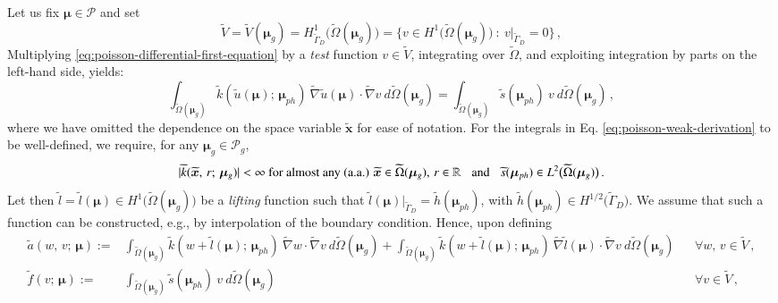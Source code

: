 \documentclass{elsarticle}
\numberwithin{equation}{section}
\theoremstyle{theorem}
\theoremstyle{definition}
\theoremstyle{remark}
\theoremstyle{proposition}
\numberwithin{figure}{section}
\newcommand{\wt}[1]{\widetilde{#1}}
\newcommand{\bg}[1]{\boldsymbol{#1}}
\begin{document}
		Let us fix $\bg{\mu} \in \mathcal{P}$ and set 
		\begin{equation*}
			\wt{V} = \wt{V}(\bg{\mu}_g) = H^1_{\wt{\Gamma}_D} \big( \wt{\Omega}(\bg{\mu}_g) \big) = \big\lbrace v \in H^1 \big( \wt{\Omega}(\bg{\mu}_g) \big) ~ : ~ v \big\rvert_{\wt{\Gamma}_D} = 0 \big\rbrace \, ,
		\end{equation*}
		Multiplying \eqref{eq:poisson-differential-first-equation} by a \emph{test} function $v \in \wt{V}$, integrating over $\wt{\Omega}$, and exploiting integration by parts on the left-hand side, yields:
		\begin{equation}
			\label{eq:poisson-weak-derivation}
			\int_{\wt{\Omega}(\bg{\mu}_g)} \wt{k}(\wt{u}(\bg{\mu}); \, \bg{\mu}_{ph}) ~ \wt{\nabla} \wt{u}(\bg{\mu}) \cdot \wt{\nabla} v ~ d\wt{\Omega}(\bg{\mu}_g) = \int_{\wt{\Omega}(\bg{\mu}_g)} \wt{s}(\bg{\mu}_{ph}) ~ v ~ d\wt{\Omega}(\bg{\mu}_g) \, ,
		\end{equation}
		where we have omitted the dependence on the space variable $\wt{\bg{x}}$ for ease of notation. For the integrals in Eq. \eqref{eq:poisson-weak-derivation} to be well-defined, we require, for any $\bg{\mu}_g \in \mathcal{P}_g$, 
		\begin{equation*}
			\text{$|\wt{k}(\wt{\bg{x}}, \, r; \, \bg{\mu}_g)| < \infty$ for almost any (a.a.) $\wt{\bg{x}} \in \wt{\Omega}(\bg{\mu}_g), \, r \in \mathbb{R}$}  \hspace*{0.3cm} \text{and} \hspace*{0.3cm} \wt{s}(\bg{\mu}_{ph}) \in L^2 \big( \wt{\Omega}(\bg{\mu}_g) \big) \, .
		\end{equation*}
		Let then $\wt{l} = \wt{l}(\bg{\mu}) \in H^1 \big( \wt{\Omega}(\bg{\mu}_g) \big)$ be a \emph{lifting} function such that $\wt{l}(\bg{\mu}) \big\rvert_{\wt{\Gamma}_D} = \wt{h}(\bg{\mu}_{ph})$, with $\wt{h}(\bg{\mu}_{ph}) \in H^{1/2} \big( \wt{\Gamma}_D \big)$. We assume that such a function can be constructed, e.g., by interpolation of the boundary condition. Hence, upon defining
		\begin{equation}
			\label{eq:poisson-weak-forms}
			\begin{aligned}
				\wt{a}(w, \, v; \, \bg{\mu}) := & \int_{\wt{\Omega}(\bg{\mu}_g)} \wt{k}(w + \wt{l}(\bg{\mu}); \, \bg{\mu}_{ph}) ~ \wt{\nabla} w \cdot \wt{\nabla} v ~ d\wt{\Omega}(\bg{\mu}_g) + \int_{\wt{\Omega}(\bg{\mu}_g)} \wt{k}(w + \wt{l}(\bg{\mu}); \, \bg{\mu}_{ph}) ~ \wt{\nabla} \wt{l}(\bg{\mu}) \cdot \wt{\nabla} v ~ d\wt{\Omega}(\bg{\mu}_g) && \forall w, \, v \in \wt{V} \, , \\
				\wt{f}(v; \, \bg{\mu}) := & \int_{\wt{\Omega}(\bg{\mu}_g)} \wt{s}(\bg{\mu}_{ph}) ~ v ~ d\wt{\Omega}(\bg{\mu}_g) && \forall v \in \wt{V} \, ,
			\end{aligned}
		\end{equation}
\end{document}
